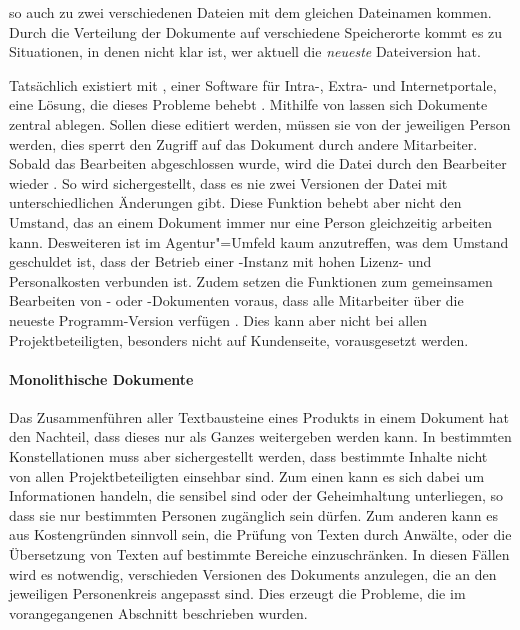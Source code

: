 so auch zu zwei verschiedenen Dateien mit dem gleichen Dateinamen kommen. Durch die Verteilung der Dokumente auf verschiedene Speicherorte kommt es zu Situationen, in denen nicht klar ist, wer aktuell die \emph{neueste} Dateiversion hat.

Tatsächlich existiert mit  , einer Software für Intra-, Extra- und Internetportale, eine Lösung, die dieses Probleme behebt \cite{sharepoint-shared-documents}. Mithilfe von  lassen sich Dokumente zentral ablegen. Sollen diese editiert werden, müssen sie von der jeweiligen Person  werden, dies sperrt den Zugriff auf das Dokument durch andere Mitarbeiter. Sobald das Bearbeiten abgeschlossen wurde, wird die Datei durch den Bearbeiter wieder . So wird sichergestellt, dass es nie zwei Versionen der Datei mit unterschiedlichen Änderungen gibt. Diese Funktion behebt aber nicht den Umstand, das an einem Dokument immer nur eine Person gleichzeitig arbeiten kann. Desweiteren ist  im Agentur"=Umfeld kaum anzutreffen, was dem Umstand geschuldet ist, dass der Betrieb einer -Instanz mit hohen Lizenz- und Personalkosten verbunden ist. Zudem setzen die Funktionen zum gemeinsamen Bearbeiten von - oder -Dokumenten voraus, dass alle Mitarbeiter über die neueste Programm-Version verfügen \cite{sharepoint-wordversions}. Dies kann aber nicht bei allen Projektbeteiligten, besonders nicht auf Kundenseite, vorausgesetzt werden.

\paragraph{Monolithische Dokumente} Das Zusammenführen aller Textbausteine eines Produkts in einem Dokument hat den Nachteil, dass dieses nur als Ganzes weitergeben werden kann. In bestimmten Konstellationen muss aber sichergestellt werden, dass bestimmte Inhalte nicht von allen Projektbeteiligten einsehbar sind. Zum einen kann es sich dabei um Informationen handeln, die sensibel sind oder der Geheimhaltung unterliegen, so dass sie nur bestimmten Personen zugänglich sein dürfen. Zum anderen kann es aus Kostengründen sinnvoll sein, die Prüfung von Texten durch Anwälte, oder die Übersetzung von Texten auf bestimmte Bereiche einzuschränken. In diesen Fällen wird es notwendig, verschieden Versionen des Dokuments anzulegen, die an den jeweiligen Personenkreis angepasst sind. Dies erzeugt die Probleme, die im vorangegangenen Abschnitt beschrieben wurden.

